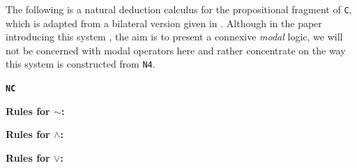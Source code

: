 \documentclass{article}%
\theoremstyle{break}
\begin{document}
The following is a natural deduction calculus for the propositional fragment of \texttt{C}, which is adapted from a bilateral version given in \cite[p. 419f.]{Wansing2016}. 
Although in the paper introducing this system \cite{Wansing2005}, the aim is to present a connexive \emph{modal} logic, we will not be concerned with modal operators here and rather concentrate on the way this system is constructed from \texttt{N4}.


\vspace{0.5cm}

{\Large\textbf{\texttt{NC}}} 
\vspace{0.2cm}

\textbf{Rules for ${\sim}$:}
\vspace{0.2cm}


\quad   
{}
\quad 
{}

\vspace{0.2cm}

\textbf{Rules for $\wedge$:}

\vspace{0.2cm}
\quad  
{}
\quad   
{}
\quad   
{}


\vspace{0.2cm}
\quad   
{}
\quad \quad
{}
\quad
\hspace{-0.5cm}  
\vspace{0.2cm}

\textbf{Rules for $\vee$:}

\vspace{0.2cm}
\quad  
{}
\quad  \quad
{}
\quad 
\hspace{-0.5cm} 
\end{document}
